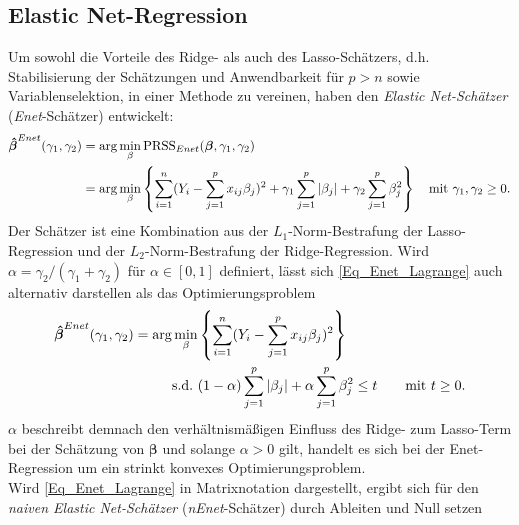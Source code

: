 \documentclass[12pt, a4paper]{report}\usepackage[]{graphicx}\usepackage[]{color}
\begin{document}
\subsection{Elastic Net-Regression}\label{Kap_Elastic-Net}
Um sowohl die Vorteile des Ridge- als auch des Lasso-Schätzers, d.h. Stabilisierung der Schätzungen und Anwendbarkeit für $p>n$ sowie Variablenselektion, in einer Methode zu vereinen, haben  den \textit{Elastic Net-Schätzer} (\textit{Enet}-Schätzer) entwickelt:
\begin{align}\label{Eq_Enet_Lagrange}
\boldsymbol{\hat{\beta}}^{Enet}(\gamma_1, \gamma_2)&=\arg \displaystyle\min_{\beta} \textnormal{PRSS}_{Enet}(\boldsymbol{\beta}, \gamma_1, \gamma_2) \notag \\
&=\arg \displaystyle\min_{\beta} \left\lbrace \sum_{i=1}^{n} (Y_i - \sum_{j=1}^{p} x_{ij} \beta_j)^2  + \gamma_1 \sum_{j=1}^{p}|\beta_j| + \gamma_2 \sum_{j=1}^{p}\beta_j^2 \right\rbrace \quad \text{mit} \ \gamma_1,\gamma_2 \ge 0.
\end{align}
Der Schätzer ist eine Kombination aus der $L_1$-Norm-Bestrafung der Lasso-Regression und der $L_2$-Norm-Bestrafung der Ridge-Regression. Wird $\alpha=\gamma_2 / (\gamma_1+\gamma_2)$ für $\alpha \in [0,1]$ definiert, lässt sich \eqref{Eq_Enet_Lagrange} auch alternativ darstellen als das Optimierungsproblem
\begin{align}\label{Eq_Enet_Constraint}
\boldsymbol{\hat{\beta}}^{Enet}(\gamma_1, \gamma_2)=\arg \displaystyle\min_{\beta} &\left\lbrace \sum_{i=1}^{n} (Y_i - \sum_{j=1}^{p} x_{ij} \beta_j)^2 \right\rbrace \notag \\
\text{s.d.} \ &(1-\alpha)\sum_{j=1}^{p}|\beta_j|+\alpha \sum_{j=1}^{p}\beta_j^2 \leq t \qquad \text{mit} \  t \geq 0.
\end{align}
$\alpha$ beschreibt demnach den verhältnismäßigen Einfluss des Ridge- zum Lasso-Term bei der Schätzung von $\boldsymbol{\beta}$ und solange $\alpha > 0$ gilt, handelt es sich bei der Enet-Regression um ein strinkt konvexes Optimierungsproblem.\\
Wird \eqref{Eq_Enet_Lagrange} in Matrixnotation dargestellt, ergibt sich für den \textit{naiven Elastic Net-Schätzer} (\textit{nEnet}-Schätzer) durch Ableiten und Null setzen
\end{document}
